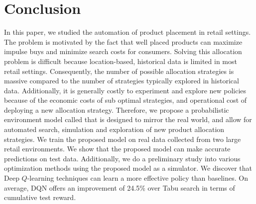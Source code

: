 \section{Conclusion}

In this paper, we studied the automation of product placement in retail settings. The problem is motivated by the fact that well placed products can maximize impulse buys and minimize search costs for consumers. Solving this allocation problem is difficult because location-based, historical data is limited in most retail settings. Consequently, the number of possible allocation strategies is massive compared to the number of strategies typically explored in historical data. Additionally, it is generally costly to experiment and explore new policies because of the economic costs of sub optimal strategies, and operational cost of deploying a new allocation strategy. Therefore, we propose a probabilistic environment model called that is designed to mirror the real world, and allow for automated search, simulation and exploration of new product allocation strategies. We train the proposed model on real data collected from two large retail environments. We show that the proposed model can make accurate predictions on test data. Additionally, we do a preliminary study into various optimization methods using the proposed model as a simulator. We discover that Deep $Q$-learning techniques can learn a more effective policy than baselines. On average, DQN offers an improvement of 24.5\% over Tabu search in terms of cumulative test reward.